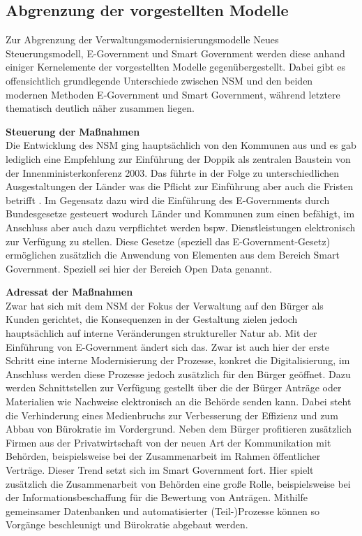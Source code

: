 \subsection{Abgrenzung der vorgestellten Modelle}
Zur Abgrenzung der Verwaltungsmodernisierungsmodelle Neues Steuerungsmodell, E-Government und Smart Government werden diese anhand einiger Kernelemente der vorgestellten Modelle gegenübergestellt.
Dabei gibt es offensichtlich grundlegende Unterschiede zwischen NSM und den beiden \glqq{}modernen\grqq{} Methoden E-Government und Smart Government, während letztere thematisch deutlich näher zusammen liegen.

\textbf{Steuerung der Maßnahmen}\\
Die Entwicklung des NSM ging hauptsächlich von den Kommunen aus und es gab lediglich eine Empfehlung zur Einführung der Doppik als zentralen Baustein von der Innenministerkonferenz 2003.
Das führte in der Folge zu unterschiedlichen Ausgestaltungen der Länder was die Pflicht zur Einführung aber auch die Fristen betrifft \citep[][]{Mehde2019}.
Im Gegensatz dazu wird die Einführung des E-Governments durch Bundesgesetze gesteuert wodurch Länder und Kommunen zum einen befähigt, im Anschluss aber auch dazu verpflichtet werden bspw. Dienstleistungen elektronisch zur Verfügung zu stellen.
Diese Gesetze (speziell das E-Government-Gesetz) ermöglichen zusätzlich die Anwendung von Elementen aus dem Bereich Smart Government.
Speziell sei hier der Bereich Open Data genannt.

\textbf{Adressat der Maßnahmen}\\
Zwar hat sich mit dem NSM der Fokus der Verwaltung auf den Bürger als Kunden gerichtet, die Konsequenzen in der Gestaltung zielen jedoch hauptsächlich auf interne Veränderungen struktureller Natur ab.
Mit der Einführung von E-Government ändert sich das.
Zwar ist auch hier der erste Schritt eine interne Modernisierung der Prozesse, konkret die Digitalisierung, im Anschluss werden diese Prozesse jedoch zusätzlich für den Bürger geöffnet.
Dazu werden Schnittstellen zur Verfügung gestellt über die der Bürger Anträge oder Materialien wie Nachweise elektronisch an die Behörde senden kann.
Dabei steht die Verhinderung eines Medienbruchs zur Verbesserung der Effizienz und zum Abbau von Bürokratie im Vordergrund.
Neben dem Bürger profitieren zusätzlich Firmen aus der Privatwirtschaft von der neuen Art der Kommunikation mit Behörden, beispielsweise bei der Zusammenarbeit im Rahmen öffentlicher Verträge.
Dieser Trend setzt sich im Smart Government fort.
Hier spielt zusätzlich die Zusammenarbeit von Behörden eine große Rolle, beispielsweise bei der Informationsbeschaffung für die Bewertung von Anträgen.
Mithilfe gemeinsamer Datenbanken und automatisierter (Teil-)Prozesse können so Vorgänge beschleunigt und Bürokratie abgebaut werden.

